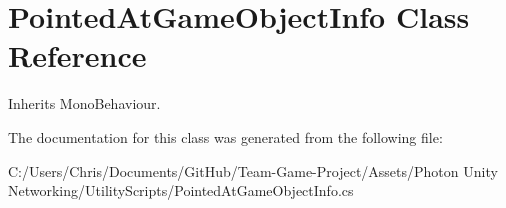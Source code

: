 \hypertarget{class_pointed_at_game_object_info}{}\section{Pointed\+At\+Game\+Object\+Info Class Reference}
\label{class_pointed_at_game_object_info}


Inherits Mono\+Behaviour.



The documentation for this class was generated from the following file\+:\begin{DoxyCompactItemize}
\item 
C\+:/\+Users/\+Chris/\+Documents/\+Git\+Hub/\+Team-\/\+Game-\/\+Project/\+Assets/\+Photon Unity Networking/\+Utility\+Scripts/Pointed\+At\+Game\+Object\+Info.\+cs\end{DoxyCompactItemize}
